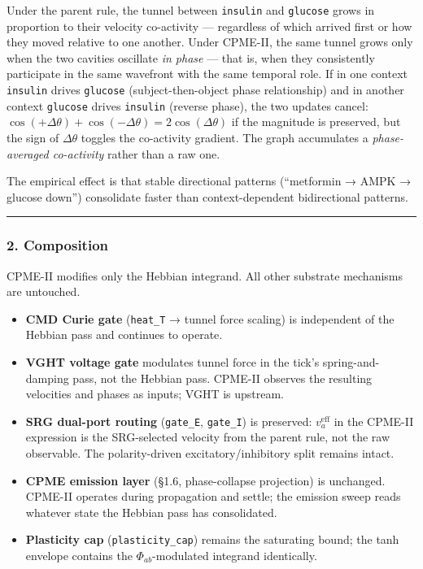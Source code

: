 \documentclass[
  11pt,
  a4paper,
]{article}
\providecommand{\tightlist}{%
  \setlength{\itemsep}{0pt}\setlength{\parskip}{0pt}}
\begin{document}
Under the parent rule, the tunnel between \texttt{insulin} and
\texttt{glucose} grows in proportion to their velocity co-activity ---
regardless of which arrived first or how they moved relative to one
another. Under CPME-II, the same tunnel grows only when the two cavities
oscillate \emph{in phase} --- that is, when they consistently
participate in the same wavefront with the same temporal role. If in one
context \texttt{insulin} drives \texttt{glucose} (subject-then-object
phase relationship) and in another context \texttt{glucose} drives
\texttt{insulin} (reverse phase), the two updates cancel:
\(\cos(+\Delta\theta) +
\cos(-\Delta\theta) = 2\cos(\Delta\theta)\) if the magnitude is
preserved, but the sign of \(\Delta \theta\) toggles the co-activity
gradient. The graph accumulates a \emph{phase-averaged co-activity}
rather than a raw one.

The empirical effect is that stable directional patterns (``metformin →
AMPK → glucose down'') consolidate faster than context-dependent
bidirectional patterns.

\begin{center}\rule{0.5\linewidth}{0.5pt}\end{center}

\subsubsection{2. Composition}\label{composition-1}

CPME-II modifies only the Hebbian integrand. All other substrate
mechanisms are untouched.

\begin{itemize}
\tightlist
\item
  \textbf{CMD Curie gate} (\texttt{heat\_T} → tunnel force scaling) is
  independent of the Hebbian pass and continues to operate.
\item
  \textbf{VGHT voltage gate} modulates tunnel force in the tick's
  spring-and-damping pass, not the Hebbian pass. CPME-II observes the
  resulting velocities and phases as inputs; VGHT is upstream.
\item
  \textbf{SRG dual-port routing} (\texttt{gate\_E}, \texttt{gate\_I}) is
  preserved: \(v_a^{\text{eff}}\) in the CPME-II expression is the
  SRG-selected velocity from the parent rule, not the raw observable.
  The polarity-driven excitatory/inhibitory split remains intact.
\item
  \textbf{CPME emission layer} (§1.6, phase-collapse projection) is
  unchanged. CPME-II operates during propagation and settle; the
  emission sweep reads whatever state the Hebbian pass has consolidated.
\item
  \textbf{Plasticity cap} (\texttt{plasticity\_cap}) remains the
  saturating bound; the tanh envelope contains the
  \(\Phi_{ab}\)-modulated integrand identically.
\end{itemize}
\end{document}
